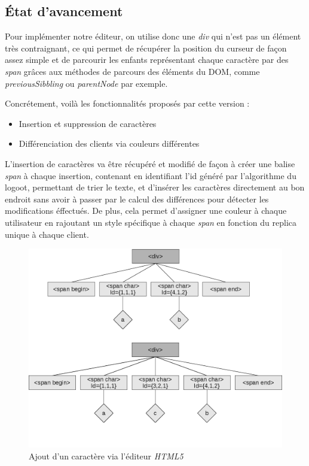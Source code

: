 	\subsection{État d'avancement}

	Pour implémenter notre éditeur, on utilise donc une \emph{div} qui n'est pas
	un élément très contraignant, ce qui permet de récupérer la position du
	curseur de façon assez simple et de parcourir les enfants représentant 
	chaque caractère par des \emph{span} grâces aux méthodes de parcours des 
	éléments du DOM, comme \emph{previousSibbling} ou \emph{parentNode} par 
	exemple.
	
	Concrétement, voilà les fonctionnalités proposés par cette version :
	\begin{itemize}
		\item Insertion et suppression de caractères
		\item Différenciation des clients via couleurs différentes 
	\end{itemize}
	
	L'insertion de caractères va être récupéré et modifié de façon à créer une 
	balise \emph{span} à chaque insertion, contenant en identifiant l'id généré 
	par l'algorithme du logoot, permettant de trier le texte, et d'insérer les 
	caractères directement au bon endroit sans avoir à passer par le calcul des 
	différences pour détecter les modifications éffectués.
	De plus, cela permet d'assigner une couleur à chaque utilisateur 
	en rajoutant un style spécifique à chaque \emph{span} en fonction du
	replica unique à chaque client.

	\begin{figure}[h]
		\label{fig:html5}
		\includegraphics[width=\textwidth]{includes/html5.png}
		\caption{Ajout d'un caractère via l'éditeur \emph{HTML5}}
	\end{figure}
	
